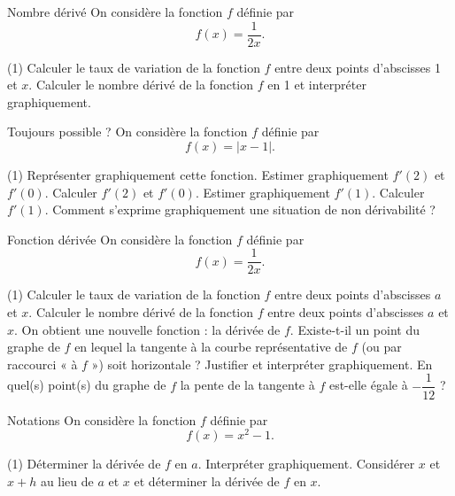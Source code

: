 \documentclass[a4paper,12pt]{article}
\begin{document}
\begin{activite}{Nombre dérivé}
\tcblower
On considère la fonction \(f\) définie par
\[
  f(x)=\dfrac{1}{2x}.
\]
\begin{tasks}(1)
  \task Calculer le taux de variation de la fonction \(f\) entre deux points d’abscisses 1 et \(x\).
  \task Calculer le nombre dérivé de la fonction \(f\) en 1 et interpréter graphiquement.
\end{tasks}
\end{activite}

\begin{activite}{Toujours possible ?}
\tcblower
On considère la fonction \(f\) définie par
\[
  f(x)=\lvert x-1\rvert.
\]
\begin{tasks}(1)
  \task Représenter graphiquement cette fonction.
  \task Estimer graphiquement \(f'(2)\) et \(f'(0)\).
  \task Calculer \(f'(2)\) et \(f'(0)\).
  \task Estimer graphiquement \(f'(1)\).
  \task Calculer \(f'(1)\).
  \task Comment s’exprime graphiquement une situation de non dérivabilité ?
\end{tasks}
\end{activite}

\begin{activite}{Fonction dérivée}
\tcblower
On considère la fonction \(f\) définie par
\[
  f(x)=\dfrac{1}{2x}.
\]
\begin{tasks}(1)
  \task Calculer le taux de variation de la fonction \(f\) entre deux points d’abscisses \(a\) et \(x\).
  \task Calculer le nombre dérivé de la fonction \(f\) entre deux points d’abscisses \(a\) et \(x\). On obtient une nouvelle fonction : la dérivée de \(f\).
  \task Existe-t-il un point du graphe de \(f\) en lequel la tangente à la courbe représentative de \(f\) (ou par raccourci « à \(f\) ») soit horizontale ? Justifier et interpréter graphiquement.
  \task En quel(s) point(s) du graphe de \(f\) la pente de la tangente à \(f\) est-elle égale à \(-\dfrac{1}{12}\) ?
\end{tasks}
\end{activite}

\begin{activite}{Notations}
\tcblower
On considère la fonction \(f\) définie par
\[
  f(x)=x^2-1.
\]
\begin{tasks}(1)
  \task Déterminer la dérivée de \(f\) en \(a\).
  \task Interpréter graphiquement.
  \task Considérer \(x\) et \(x+h\) au lieu de \(a\) et \(x\) et déterminer la dérivée de \(f\) en \(x\).
\end{tasks}
\end{activite}
\end{document}
